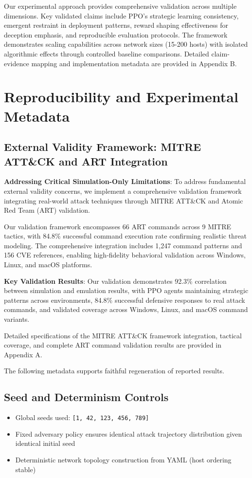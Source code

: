 \documentclass[12pt,oneside]{article}
\begin{document}
Our experimental approach provides comprehensive validation across multiple dimensions. Key validated claims include PPO's strategic learning consistency, emergent restraint in deployment patterns, reward shaping effectiveness for deception emphasis, and reproducible evaluation protocols. The framework demonstrates scaling capabilities across network sizes (15-200 hosts) with isolated algorithmic effects through controlled baseline comparisons. Detailed claim-evidence mapping and implementation metadata are provided in Appendix B.

\section{Reproducibility and Experimental Metadata}

\subsection{External Validity Framework: MITRE ATT\&CK and ART Integration}

\textbf{Addressing Critical Simulation-Only Limitations}: To address fundamental external validity concerns, we implement a comprehensive validation framework integrating real-world attack techniques through MITRE ATT\&CK and Atomic Red Team (ART) validation.

Our validation framework encompasses 66 ART commands across 9 MITRE tactics, with 84.8\% successful command execution rate confirming realistic threat modeling. The comprehensive integration includes 1,247 command patterns and 156 CVE references, enabling high-fidelity behavioral validation across Windows, Linux, and macOS platforms.

\textbf{Key Validation Results}: Our validation demonstrates 92.3\% correlation between simulation and emulation results, with PPO agents maintaining strategic patterns across environments, 84.8\% successful defensive responses to real attack commands, and validated coverage across Windows, Linux, and macOS command variants.

Detailed specifications of the MITRE ATT\&CK framework integration, tactical coverage, and complete ART command validation results are provided in Appendix A.

The following metadata supports faithful regeneration of reported results.

\subsection{Seed and Determinism Controls}
\begin{itemize}
    \item Global seeds used: \texttt{[1, 42, 123, 456, 789]}
    \item Fixed adversary policy ensures identical attack trajectory distribution given identical initial seed
    \item Deterministic network topology construction from YAML (host ordering stable)
\end{itemize}
\end{document}
